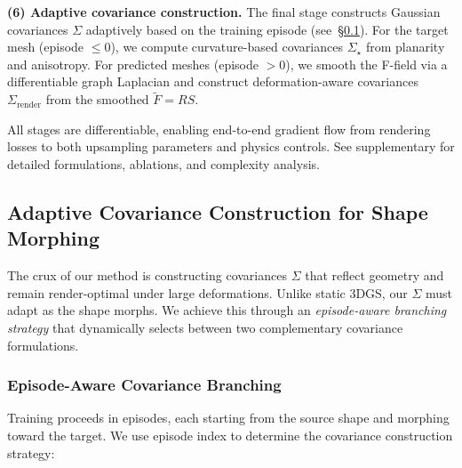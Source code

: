     \textbf{(6) Adaptive covariance construction.}
    The final stage constructs Gaussian covariances $\Sigma$ adaptively based on the training episode (see~\S\ref{sec:covariance}). For the target mesh (episode $\leq 0$), we compute curvature-based covariances $\Sigma_\star$ from planarity and anisotropy. For predicted meshes (episode $> 0$), we smooth the F-field via a differentiable graph Laplacian and construct deformation-aware covariances $\Sigma_{\text{render}}$ from the smoothed $\tilde{F}=RS$.
    
All stages are differentiable, enabling end-to-end gradient flow from rendering losses to both upsampling parameters and physics controls. See supplementary for detailed formulations, ablations, and complexity analysis.

\subsection{Adaptive Covariance Construction for Shape Morphing}
\label{sec:covariance}

    The crux of our method is constructing covariances $\Sigma$ that reflect geometry and remain render-optimal under large deformations. Unlike static 3DGS, our $\Sigma$ must adapt as the shape morphs. We achieve this through an \emph{episode-aware branching strategy} that dynamically selects between two complementary covariance formulations.

\subsubsection{Episode-Aware Covariance Branching}

    Training proceeds in episodes, each starting from the source shape and morphing toward the target. We use episode index to determine the covariance construction strategy:
    
